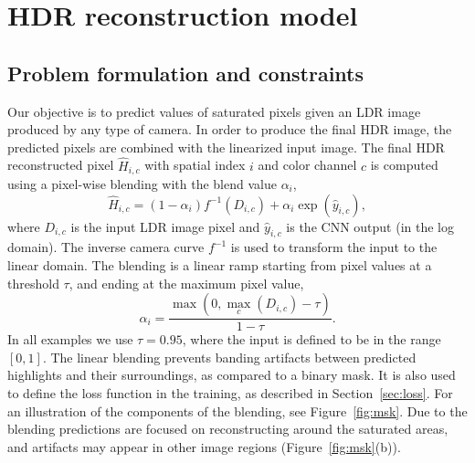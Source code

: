 \documentclass[acmtog]{acmart}
\newcommand{\figref}[1]{Figure~\ref{fig:#1}}
\newcommand{\secref}[1]{Section~\ref{sec:#1}}
\newcommand{\hdrp}{H}
\newcommand{\rhdrp}{\hat{\hdrp}}
\newcommand{\yp}{\hat{y}}
\newcommand{\ldrp}{D}
\newcommand{\cc}{f}
\newcommand{\msk}{\alpha}
\begin{document}
\section{HDR reconstruction model}\label{sec:method}

\subsection{Problem formulation and constraints}\label{sec:problem}
Our objective is to predict values of saturated pixels given an LDR image produced by any type of camera. In order to produce the final HDR image, the predicted pixels are combined with the linearized input image. The final HDR reconstructed pixel $\rhdrp_{i,c}$ with spatial index $i$ and color channel $c$ is computed using a pixel-wise blending with the blend value $\msk_i$,
\begin{equation}
\rhdrp_{i,c} = (1-\msk_i) \cc^{-1}(\ldrp_{i,c}) + \msk_i \exp(\yp_{i,c}),
\label{eqn:masking}
\end{equation}
where $\ldrp_{i,c}$ is the input LDR image pixel and $\yp_{i,c}$ is the CNN output (in the log domain). The inverse camera curve $\cc^{-1}$ is used to transform the input to the linear domain. The blending is a linear ramp starting from pixel values at a threshold $\tau$, and ending at the maximum pixel value, 
\begin{equation}
\msk_i = \frac{\max(0, \max_c(\ldrp_{i,c})-\tau)}{1-\tau}.
\label{eqn:mask}
\end{equation}
 In all examples we use $\tau = 0.95$, where the input is defined to be in the range $[0,1]$. The linear blending prevents banding artifacts between predicted highlights and their surroundings, as compared to a binary mask. It is also used to define the loss function in the training, as described in \secref{loss}. For an illustration of the components of the blending, see \figref{msk}. Due to the blending predictions are focused on reconstructing around the saturated areas, and artifacts may appear in other image regions (\figref{msk}(b)).
\end{document}
